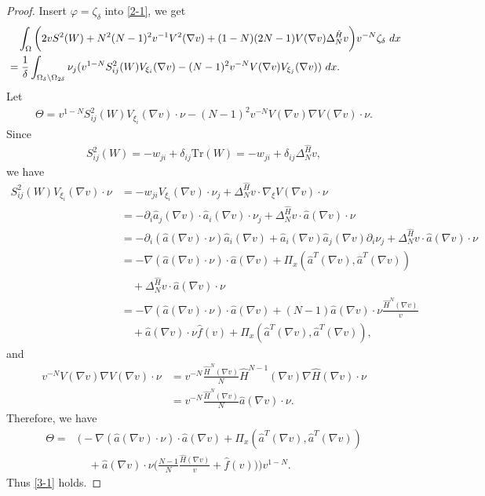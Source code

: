 \documentclass[10pt,a4paper]{amsart}
\numberwithin{equation}{section}
\newcommand{\pa}{\partial}
\newcommand{\dx}{\textup{d}x}
\begin{document}
\begin{proof}
    Insert $\varphi = \zeta_{\delta}$ into \eqref{2-1}, we get
    \begin{align*}
        & \quad \int_{\Omega} \bigg(  2 v S^2(W) +  N^2(N-1)^2 v^{-1} V^2(\nabla v) + (1-N)(2N-1) V(\nabla v) \Delta_N^{\hat{H}} v \bigg) v^{-N}\zeta_{\delta} \ \dx \\
        &= \frac{1}{\delta} \int_{\Omega_{\delta} \backslash    \Omega_{2 \delta}} \nu_j (v^{1-N} S^2_{ij}(W) V_{\xi_i}(\nabla v) - (N-1)^2 v^{-N} V(\nabla v) V_{\xi_j}(\nabla v) ) \ \dx.
    \end{align*}
    Let
    \begin{align*}
        \Theta = v^{1-N} S^2_{ij}(W) V_{\xi_i}(\nabla v) \cdot \nu
        - (N-1)^2 v^{-N} V(\nabla v) \nabla V(\nabla v) \cdot \nu.
    \end{align*}
    Since
    \begin{align*}
        S^2_{ij}(W) = - w_{ji} + \delta_{ij} \text{Tr}(W) = - w_{ji} + \delta_{ij} \Delta_N^{\hat{H}} v,
    \end{align*}
    we have
    \begin{align*}
        S^2_{ij}(W) V_{\xi_i}(\nabla v) \cdot \nu & = - w_{ji} V_{\xi_i}(\nabla v) \cdot \nu_j + \Delta_N^{\hat{H}} v \cdot \nabla_{\xi} V(\nabla v) \cdot \nu \\
        & = - \pa_i \hat{a}_j(\nabla v) \cdot \hat{a}_i(\nabla v) \cdot \nu_j + \Delta_N^{\hat{H}} v \cdot \hat{a}(\nabla v) \cdot \nu \\
        & = - \pa_i (\hat{a} (\nabla v) \cdot \nu) \hat{a}_i(\nabla v) + \hat{a}_i(\nabla v) \hat{a}_j(\nabla v) \pa_i \nu_j + \Delta_N^{\hat{H}} v \cdot \hat{a}(\nabla v) \cdot \nu \\
        & = - \nabla(\hat{a}(\nabla v) \cdot \nu) \cdot \hat{a}(\nabla v) + \Pi_x(\hat{a}^T(\nabla v), \hat{a}^T(\nabla v)) \\
        &\quad + \Delta_N^{\hat{H}} v \cdot \hat{a}(\nabla v) \cdot \nu  \\
        & = -\nabla(\hat{a}(\nabla v) \cdot \nu) \cdot \hat{a}(\nabla v) + (N-1)\hat{a}(\nabla v) \cdot \nu  \frac{\hat{H}^N(\nabla v)}{v} \\
        & \quad+ \hat{a}(\nabla v) \cdot \nu \hat{f}(v) + \Pi_x(\hat{a}^T(\nabla v), \hat{a}^T(\nabla v)),
    \end{align*}
    and
    \begin{align*}
        v^{-N} V(\nabla v) \nabla V(\nabla v) \cdot \nu & = v^{-N} \frac{\hat{H}^N(\nabla v)}{N} \hat{H}^{N-1}(\nabla v) \nabla \hat{H}(\nabla v) \cdot \nu \\
        & = v^{-N} \frac{\hat{H}^N(\nabla v)}{N} \hat{a}(\nabla v) \cdot  \nu.
    \end{align*}
    Therefore, we have
    \begin{align*}
        \Theta = &\bigg( - \nabla(\hat{a}(\nabla v) \cdot \nu) \cdot \hat{a}(\nabla v) + \Pi _x(\hat{a}^T(\nabla v), \hat{a}^T(\nabla v)) \\
        & \quad + \hat{a}(\nabla v)\cdot \nu \bigg( \frac{N-1}{N} \frac{\hat{H}(\nabla v)}{v} + \hat{f}(v)\bigg)\bigg) v^{1-N}.
    \end{align*}
    Thus \eqref{3-1} holds.
\end{proof}
\end{document}
